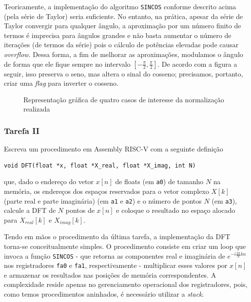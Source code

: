 \documentclass[a4paper,12pt]{article}
\newcommand{\cod}[1]{\texttt{#1}}
\begin{document}
Teoricamente, a implementação do algoritmo \cod{SINCOS} conforme descrito acima (pela série de Taylor) seria suficiente. No entanto, na prática, apesar da série de Taylor convergir para qualquer ângulo, a aproximação por um número finito de termos é imprecisa para ângulos grandes e não basta aumentar o número de iterações (de termos da série) pois o cálculo de potências elevadas pode causar \textit{overflow}. Dessa forma, a fim de melhorar as aproximações, modulamos o ângulo de forma que ele fique sempre no intervalo $\left[-\frac{\pi}{2}, \frac{\pi}{2}\right]$. De acordo com a figura a seguir, isso preserva o seno, mas altera o sinal do cosseno; precisamos, portanto, criar uma \textit{flag} para inverter o cosseno.

\begin{figure}[H]
    \centering
    
    \caption{Representação gráfica de quatro casos de interesse da normalização realizada}
\end{figure}

\subsubsection{Tarefa II}
\begin{tcolorbox}[title=Enunciado, colback=blue!5!white, colframe=blue!75!black]
Escreva um procedimento em Assembly RISC-V com a seguinte definição 
\begin{center}
\vspace{-10pt}
\begin{minipage}{0.8\textwidth}
\begin{verbatim}
void DFT(float *x, float *X_real, float *X_imag, int N)
\end{verbatim}
\end{minipage}
\vspace{-10pt}
\end{center}
que, dado o endereço do vetor $x[n]$ de floats (em \cod{a0}) de tamanho $N$ na memória, os endereços dos espaços reservados para o vetor complexo $X[k]$ (parte real e parte imaginária) (em \cod{a1} e \cod{a2}) e o número de pontos $N$ (em \cod{a3}), calcule a DFT de $N$ pontos de $x[n]$ e coloque o resultado no espaço alocado para $X_{real}[k]$ e $X_{imag}[k]$.
\end{tcolorbox}

Tendo em mãos o procedimento da última tarefa, a implementação da DFT torna-se conceitualmente simples. O procedimento consiste em criar um loop que invoca a função \cod{SINCOS} - que retorna as componentes real e imaginária de $e^{-i\frac{2\pi}{N}kn}$ nos registradores \cod{fa0} e \cod{fa1}, respectivamente - multiplicar esses valores por $x[n]$ e armazenar os resultados nas posições de memória correspondentes. A complexidade reside apenas no gerenciamento operacional dos registradores, pois, como temos procedimentos aninhados, é necessário utilizar a \textit{stack}.
\end{document}

